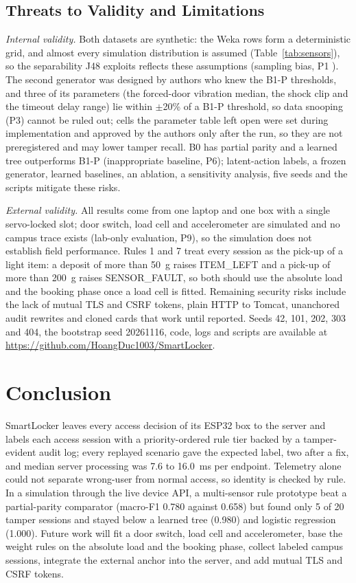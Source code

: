 \documentclass[manuscript,screen]{acmart}
\begin{document}
\subsection{Threats to Validity and Limitations}\label{sec:limits}

\textit{Internal validity.} Both datasets are synthetic: the Weka rows form a deterministic grid, and almost every
simulation distribution is assumed (Table~\ref{tab:sensors}), so the separability J48 exploits reflects these
assumptions (sampling bias, P1 \cite{arp2022dos}). The second generator was designed by authors who knew the B1-P
thresholds, and three of its parameters (the forced-door vibration median, the shock clip and the timeout delay range)
lie within $\pm$20\% of a B1-P threshold, so data snooping (P3) cannot be ruled out; cells the parameter table left open were set
during implementation and approved by the authors only after the run, so they are not preregistered and may lower
tamper recall. B0 has partial parity and a learned tree outperforms B1-P (inappropriate baseline, P6); latent-action
labels, a frozen generator, learned baselines, an ablation, a sensitivity analysis, five seeds and the scripts mitigate
these risks.

\textit{External validity.} All results come from one laptop and one box with a single servo-locked slot; door switch,
load cell and accelerometer are simulated and no campus trace exists (lab-only evaluation, P9), so the simulation does
not establish field performance. Rules 1 and 7 treat every session as the pick-up of a light item: a
deposit of more than 50~g raises ITEM\_LEFT and a pick-up of more than 200~g raises SENSOR\_FAULT, so both should use
the absolute load and the booking phase once a load cell is fitted. Remaining security
risks include the lack of mutual TLS and CSRF tokens, plain HTTP to
Tomcat, unanchored audit rewrites and cloned cards that work until reported. Seeds 42, 101, 202, 303 and 404, the
bootstrap seed 20261116, code, logs and scripts are available at \url{https://github.com/HoangDuc1003/SmartLocker}.

\section{Conclusion}

SmartLocker leaves every access decision of its ESP32 box to the server and labels each access session with a
priority-ordered rule tier backed by a tamper-evident audit log; every replayed scenario gave the expected label, two
after a fix, and median server processing was 7.6 to 16.0~ms per endpoint. Telemetry alone could not separate wrong-user from normal access, so identity is checked by rule.
In a simulation through the live device API, a multi-sensor rule prototype beat a partial-parity comparator (macro-F1
0.780 against 0.658) but found only 5 of 20 tamper sessions and stayed below a learned tree (0.980) and logistic
regression (1.000). Future work will fit a door switch, load cell and accelerometer, base the weight rules on the
absolute load and the booking phase, collect labeled campus sessions, integrate the external anchor into the server,
and add mutual TLS and CSRF tokens.
\end{document}
